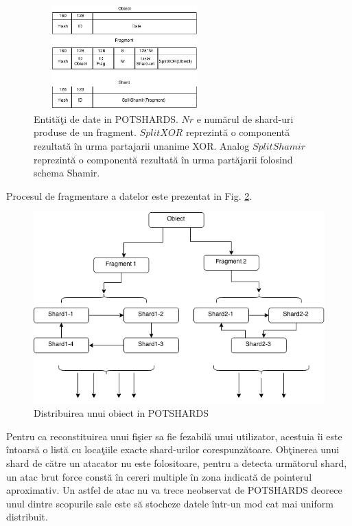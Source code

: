 \documentclass{llncs}
\begin{document}
\begin{figure}
	\begin{center}
	\includegraphics[width=7cm, height=4cm]{img/Shards.png}    %
	\caption{Entit\u{a}\c{t}i de date in POTSHARDS. $Nr$ e num\u{a}rul de shard-uri produse de un fragment.
		$SplitXOR$ reprezint\u{a} o component\u{a} rezultat\u{a} \^{i}n urma partajarii unanime XOR. Analog $SplitShamir$ reprezint\u{a} o component\u{a} rezultat\u{a} \^{i}n urma part\u{a}jarii folosind schema Shamir. \cite{SGMV:2009}}
	\label{fig:data-potshard}
	\bigskip
	\end{center}
\end{figure}

Procesul de fragmentare a datelor este prezentat in Fig. \ref{fig:potshards-layers}.

\begin{figure}
	\begin{center}
	\includegraphics[width=12cm]{img/POTSHARDS.png}    %
	\caption{Distribuirea unui obiect in POTSHARDS}
	\label{fig:potshards-layers}
	\bigskip
	\end{center}
\end{figure}

Pentru ca reconstituirea unui fi\c{s}ier sa fie fezabil\u{a} unui utilizator, acestuia \^{i}i este \^{i}ntoars\u{a} o list\u{a} cu loca\c{t}iile exacte shard-urilor corespunz\u{a}toare.
Ob\c{t}inerea unui shard de c\u{a}tre un atacator nu este folositoare, pentru a detecta urm\u{a}torul shard, un atac brut force const\u{a} \^{i}n cereri multiple \^{i}n zona indicat\u{a} de pointerul aproximativ. Un astfel de atac nu va trece neobservat de POTSHARDS deorece unul dintre scopurile sale este s\u{a} stocheze datele \^{i}ntr-un mod cat mai uniform distribuit.\cite{SGMV:2009}
\end{document}
